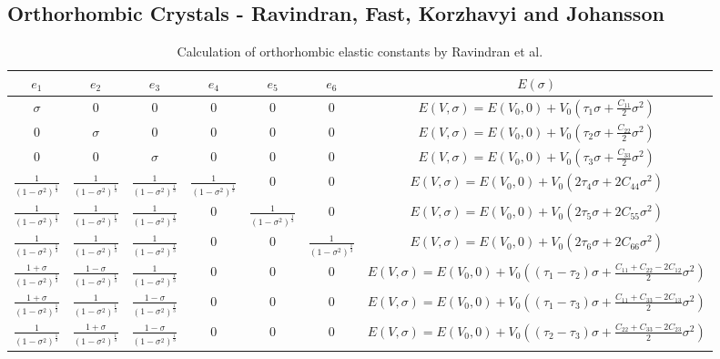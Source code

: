 \subsection{Orthorhombic Crystals - Ravindran, Fast, Korzhavyi and Johansson}

\renewcommand{\arraystretch}{1.7}
\begin{table}[!htbp]
\centering
\begin{tabular}{c c c c c c c}
\hline\hline
$e_1$ & $e_2$ & $e_3$ & $e_4$ & $e_5$ & $e_6$ & $E(\sigma)$ \\
\hline\hline
$\sigma$ & 0 & 0 & 0 & 0 & 0 &  $E(V,\sigma) = E(V_0, 0) + V_0 \left( \tau_1 \sigma + \frac{C_{11}}{2} \sigma^2 \right) $ \\
0 & $\sigma$ & 0 & 0 & 0 & 0 &  $E(V,\sigma) = E(V_0, 0) + V_0 \left( \tau_2 \sigma + \frac{C_{22}}{2} \sigma^2 \right) $ \\
0 & 0 & $\sigma$ & 0 & 0 & 0 &  $E(V,\sigma) = E(V_0, 0) + V_0 \left( \tau_3 \sigma + \frac{C_{33}}{2} \sigma^2 \right) $ \\
$\frac{1}{(1-\sigma^2)^{\frac{1}{3}}}$ & $\frac{1}{(1-\sigma^2)^{\frac{1}{3}}}$ & $\frac{1}{(1-\sigma^2)^{\frac{1}{3}}}$ & $\frac{1}{(1-\sigma^2)^{\frac{1}{3}}}$ & 0 & 0 &  $E(V,\sigma) = E(V_0, 0) + V_0 \left(2 \tau_4 \sigma + 2 C_{44} \sigma^2 \right) $ \\
$\frac{1}{(1-\sigma^2)^{\frac{1}{3}}}$ & $\frac{1}{(1-\sigma^2)^{\frac{1}{3}}}$ & $\frac{1}{(1-\sigma^2)^{\frac{1}{3}}}$ & 0 & $\frac{1}{(1-\sigma^2)^{\frac{1}{3}}}$ & 0 &  $E(V,\sigma) = E(V_0, 0) + V_0 \left(2 \tau_5 \sigma + 2 C_{55} \sigma^2 \right) $ \\
$\frac{1}{(1-\sigma^2)^{\frac{1}{3}}}$ & $\frac{1}{(1-\sigma^2)^{\frac{1}{3}}}$ & $\frac{1}{(1-\sigma^2)^{\frac{1}{3}}}$ & 0 & 0 & $\frac{1}{(1-\sigma^2)^{\frac{1}{3}}}$ &  $E(V,\sigma) = E(V_0, 0) + V_0 \left(2 \tau_6 \sigma + 2 C_{66} \sigma^2 \right) $ \\
$\frac{1+\sigma}{(1 - \sigma^2)^{\frac{1}{3}}}$ & $\frac{1-\sigma}{(1 - \sigma^2)^{\frac{1}{3}}}$ & $\frac{1}{(1 - \sigma^2)^{\frac{1}{3}}}$ & 0 & 0 & 0 &  $E(V,\sigma) = E(V_0, 0) + V_0 \left( (\tau_1 - \tau_2) \sigma + \frac{C_{11} + C_{22} - 2 C_{12} }{2} \sigma^2 \right) $ \\
$\frac{1+\sigma}{(1 - \sigma^2)^{\frac{1}{3}}}$ & $\frac{1}{(1 - \sigma^2)^{\frac{1}{3}}}$ & $\frac{1-\sigma}{(1 - \sigma^2)^{\frac{1}{3}}}$ & 0 & 0 & 0 &  $E(V,\sigma) = E(V_0, 0) + V_0 \left( (\tau_1 - \tau_3) \sigma + \frac{C_{11} + C_{33} - 2 C_{13} }{2} \sigma^2 \right) $ \\
$\frac{1}{(1 - \sigma^2)^{\frac{1}{3}}}$ & $\frac{1+\sigma}{(1 - \sigma^2)^{\frac{1}{3}}}$ & $\frac{1-\sigma}{(1 - \sigma^2)^{\frac{1}{3}}}$ & 0 & 0 & 0 &  $E(V,\sigma) = E(V_0, 0) + V_0 \left( (\tau_2 - \tau_3) \sigma + \frac{C_{22} + C_{33} - 2 C_{23} }{2} \sigma^2 \right) $ \\
\end{tabular}
\label{tab:multicol}
\caption{Calculation of orthorhombic elastic constants by Ravindran et al.\cite{dfttisiravindran}}
\end{table}


